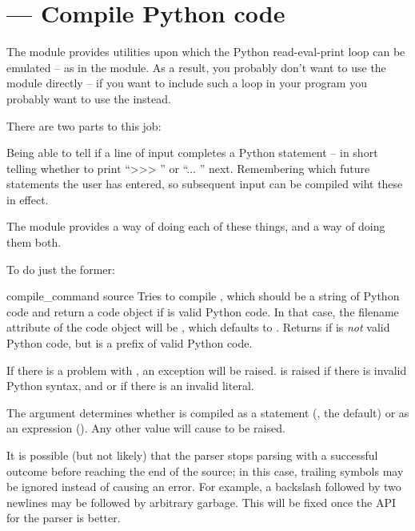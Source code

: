 \section{ ---
         Compile Python code}



The  module provides utilities upon which the Python
read-eval-print loop can be emulated -- as in the 
module.  As a result, you probably don't want to use the module
directly -- if you want to include such a loop in your program you
probably want to use the  instead.

There are two parts to this job: 

\begin{list}
\listitem Being able to tell if a line of input completes a Python 
          statement -- in short telling whether to print ``>>> '' or
          ``... '' next.
\listitem Remembering which future statements the user has entered, so 
          subsequent input can be compiled wiht these in effect.
\end{list}

The  module provides a way of doing each of these
things, and a way of doing them both.

To do just the former:

\begin{funcdesc}{compile_command}
                {source}
Tries to compile , which should be a string of Python
code and return a code object if  is valid
Python code. In that case, the filename attribute of the code object
will be , which defaults to .
Returns  if  is \emph{not} valid Python
code, but is a prefix of valid Python code.

If there is a problem with , an exception will be raised.
 is raised if there is invalid Python syntax,
and  or  if there is an
invalid literal.

The  argument determines whether  is compiled
as a statement (, the default) or as an expression
().  Any other value will cause  to 
be raised.

It is possible (but not likely) that the parser stops parsing
with a successful outcome before reaching the end of the source;
in this case, trailing symbols may be ignored instead of causing an
error.  For example, a backslash followed by two newlines may be
followed by arbitrary garbage.  This will be fixed once the API
for the parser is better.
\end{funcdesc}

